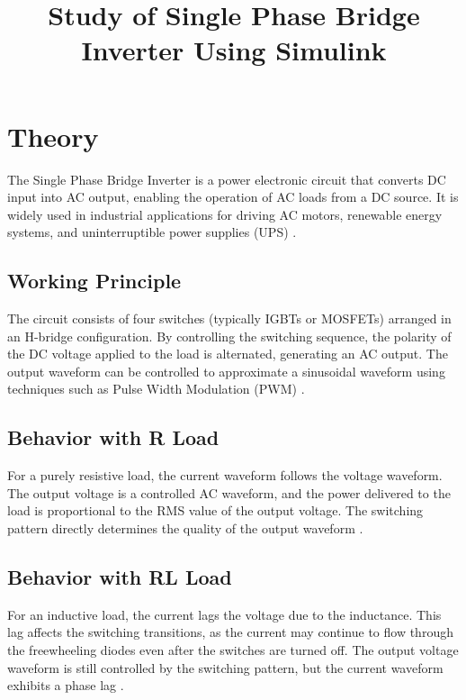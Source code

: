 \documentclass[12pt]{article}
\title{Study of Single Phase Bridge Inverter Using Simulink}
\author{}
\date{}
\begin{document}


\pagebreak

\tableofcontents

\pagebreak
{}
\maketitle

\section*{Theory}
The Single Phase Bridge Inverter is a power electronic circuit that converts DC input into AC output, enabling the operation of AC loads from a DC source. It is widely used in industrial applications for driving AC motors, renewable energy systems, and uninterruptible power supplies (UPS) \cite{rashid2013power}.

\subsection*{Working Principle}
The circuit consists of four switches (typically IGBTs or MOSFETs) arranged in an H-bridge configuration. By controlling the switching sequence, the polarity of the DC voltage applied to the load is alternated, generating an AC output. The output waveform can be controlled to approximate a sinusoidal waveform using techniques such as Pulse Width Modulation (PWM) \cite{sen1987principles}.

\subsection*{Behavior with R Load}
For a purely resistive load, the current waveform follows the voltage waveform. The output voltage is a controlled AC waveform, and the power delivered to the load is proportional to the RMS value of the output voltage. The switching pattern directly determines the quality of the output waveform \cite{mohan2003power}.

\subsection*{Behavior with RL Load}
For an inductive load, the current lags the voltage due to the inductance. This lag affects the switching transitions, as the current may continue to flow through the freewheeling diodes even after the switches are turned off. The output voltage waveform is still controlled by the switching pattern, but the current waveform exhibits a phase lag \cite{bose2002modern}.
\end{document}
